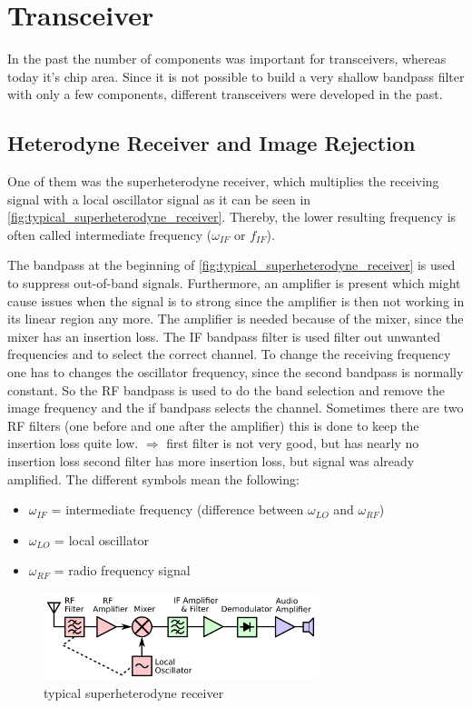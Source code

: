 \section{Transceiver}
In the past the number of components was important for transceivers, whereas today it's chip area. Since it is not possible to build a very shallow bandpass filter with only a few components, different transceivers were developed in the past. 
\subsection{Heterodyne Receiver and Image Rejection}
One of them was the superheterodyne receiver, which multiplies the receiving signal with a local oscillator signal as it can be seen in \autoref{fig:typical_superheterodyne_receiver}. Thereby, the lower resulting frequency is often called intermediate frequency ($\omega_{IF}$ or $f_{IF}$).

The bandpass at the beginning of \autoref{fig:typical_superheterodyne_receiver} is used to suppress out-of-band signals. Furthermore, an amplifier is present which might cause issues when the signal is to strong since the amplifier is then not working in its linear region any more. The amplifier is needed because of the mixer, since the mixer has an insertion loss. The IF bandpass filter is used filter out unwanted frequencies and to select the correct channel. To change the receiving frequency one has to changes the oscillator frequency, since the second bandpass is normally constant.\newline
So the RF bandpass is used to do the band selection and remove the image frequency and the if bandpass selects the channel. Sometimes there are two RF filters (one before and one after the amplifier) this is done to keep the insertion loss quite low. $\Rightarrow$ first filter is not very good, but has nearly no insertion loss second filter has more insertion loss, but signal was already amplified.\newline
The different symbols mean the following:
\begin{itemize}
    \item $\omega_{IF}$ = intermediate frequency (difference between $\omega_{LO}$ and $\omega_{RF}$)
    \item $\omega_{LO}$ = local oscillator
    \item $\omega_{RF}$ = radio frequency signal
\end{itemize}
\begin{figure}[ht]
  \centering
  \includegraphics[width=8cm]{images/Superheterodyne1.pdf}
  \caption{typical superheterodyne receiver}
  \label{fig:typical_superheterodyne_receiver}
\end{figure}
